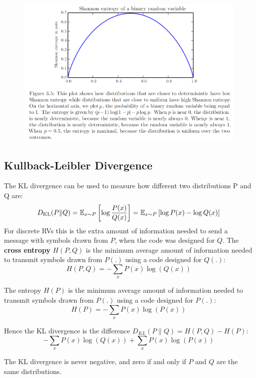\begin{multicols}{2}
	\begin{figure}[H]
		\centering
		\includegraphics[width=1\linewidth]{images/shannon.png}
	\end{figure}

	\subsection{Kullback-Leibler Divergence}
	The KL divergence can be used to measure how different two distributions P and Q are:
	\[ D_{\text{KL}}(P\lVert Q) = \mathbb{E}_{x\sim P}\left[\log \frac{P(x)}{Q(x)}\right]=
	\mathbb{E}_{x\sim P}\left[\log {P(x)} - \log {Q(x)}\right]
	 \]
	For discrete RVs this is the extra amount of information needed to send a message with symbols drawn from $P$, when the code was designed for $Q$.
	The \textbf{cross entropy} $H(P,Q)$ is the minimum average amount of information needed to transmit symbols drawn from $P(.)$ using a code designed for $Q(.)$:
	\[ H(P,Q) = -\sum_{x} P(x)\log \left(Q(x)\right) \]

	The entropy $H(P)$ is the minimum average amount of information needed to transmit symbols drawn from $P(.)$ using a code designed for $P(.)$:
	\[ H(P) = -\sum_{x} P(x) \log\left(P(x)\right) \]

  Hence the KL divergence is the difference $D_{KL}(P\lVert Q)=H(P,Q)-H(P)$:
  \[ -\sum_{x} P(x)\log \left(Q(x)\right) +\sum_{x} P(x)\log \left(P(x)\right) \]

	The KL divergence is never negative, and zero if and only if $P$ and $Q$ are the same distributions.

\end{multicols}
\newpage
